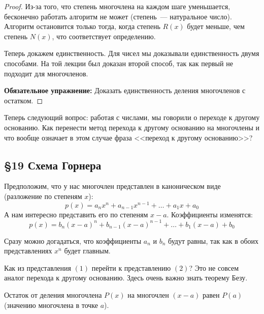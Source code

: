 \documentclass[russian]{lecture-notes}
\theoremstyle{definition}
\begin{document}
\begin{proof}
		Из-за того, что степень многочлена на каждом шаге уменьшается, бесконечно работать алгоритм не может (степень~--- натуральное число). Алгоритм остановится только тогда, когда степень $R(x)$ будет меньше, чем степень $N(x)$, что соответствует определению.
		
		Теперь докажем единственность. Для чисел мы доказывали единственность двумя способами. На той лекции был доказан второй способ, так как первый не подходит для многочленов.
		
		\noindent\textbf{Обязательное упражнение:} Доказать единственность деления многочленов с остатком.
		
	\end{proof}

	Теперь следующий вопрос: работая с числами, мы говорили о переходе к другому основанию. Как перенести метод перехода к другому основанию на многочлены и что вообще означает в этом случае фраза <<переход к другому основанию>>?
	
	\begin{center}
		\section*{\LARGE\S 19 Схема Горнера}
		\label{par:gorner}
	\end{center}
	
	Предположим, что у нас многочлен представлен в каноническом виде (разложение по степеням $x$):
	\begin{equation}
		p(x) = a_nx^n + a_{n-1}x^{n-1} + \ldots + a_1x + a_0
	\end{equation}
	А нам интересно представить его по степеням $x-a$. Коэффициенты изменятся:
	\begin{equation}
		p(x) = b_n(x-a)^n + b_{n-1}(x-a)^{n-1} + \ldots + b_1(x-a) + b_0
	\end{equation}
	
	\begin{note}
		Сразу можно догадаться, что коэффициенты $a_n$ и $b_n$ будут равны, так как в обоих представлениях $x^n$ будет главным.
	\end{note}

	Как из представления $(1)$ перейти к представлению $(2)$? Это не совсем аналог перехода к другому основанию. Здесь очень важно знать теорему Безу.
	\begin{theorem}[Безу]
		Остаток от деления многочлена $P(x)$ на многочлен $(x-a)$ равен $P(a)$ (значению многочлена в точке $a$).
	\end{theorem}
\end{document}

